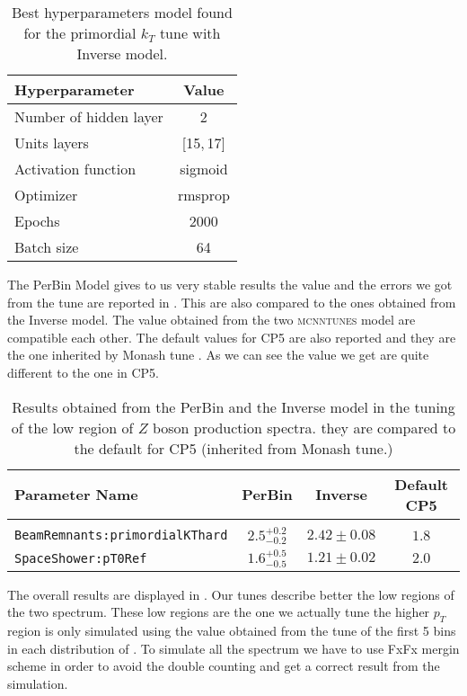 \begin{table}[!htb]
	\centering
	\begin{tabular}{ l | c }
	Hyperparameter & Value\\[2pt]\hline\hline
	Number of hidden layer & 2 \\[2pt]
	Units layers & [15,\,17] \\[2pt]
	Activation function & sigmoid \\[2pt]
	Optimizer & rmsprop\\[2pt]
	Epochs & 2000\\[2pt]
	Batch size & 64\\[2pt]
	\end{tabular}
	\caption{Best hyperparameters model found for the primordial $k_T$ tune with Inverse model.}
	\label{table:hyperpar_PrimkT}
\end{table}


\noindent The PerBin Model gives to us very stable results the value and the errors we got from the tune are reported in .  
This are also compared to the ones obtained from the Inverse model. The value obtained from the two \textsc{mcnntunes} model are compatible each other. The default values for CP5 are also reported and they are the one inherited by Monash tune \cite{Monash}. As we can see the value we get are quite different to the one in CP5.  

\begin{table}
	\centering
\begin{tabular}{l | c | c | c}
Parameter Name & PerBin & Inverse & Default CP5\\ 
\hline \hline
\\[-0.85em]
	\texttt{BeamRemnants:primordialKThard} & $ 2.5^{+0.2}_{-0.2} $ & $ 2.42\pm0.08 $ & $1.8$\\
	\texttt{SpaceShower:pT0Ref} & $ 1.6^{+0.5}_{-0.5} $ & $ 1.21\pm0.02  $ & $2.0$
\end{tabular}
\caption{Results obtained from the PerBin and the Inverse model in the tuning of the low region of $Z$ boson production spectra. they are compared to the default for CP5 (inherited from Monash tune.)}
\label{table:Primordial_kT_results}
\end{table}	

\medskip

The overall results are displayed in . Our tunes describe better the low regions of the two spectrum. These low regions are the one we actually tune the higher $p_T$ region is only simulated using the value obtained from the tune of the first 5 bins in each distribution of  . To simulate all the spectrum we have to use FxFx mergin scheme in order to avoid the double counting and get a correct result from the simulation.

